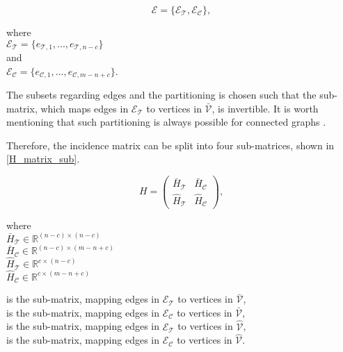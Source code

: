 \begin{equation}
  \label{edges1}
  \mathcal{E} = \{\mathcal{E_{\mathcal{T}}}, \mathcal{E_{\mathcal{C}}} \},
\end{equation}

\begin{minipage}[t]{0.35\textwidth}
where\\
\hspace*{8mm} $\mathcal{E_{\mathcal{T}}} = \{e_{\mathcal{T},1}, ..., e_{\mathcal{T},n-c}\}$\\
and\\
\hspace*{8mm} $\mathcal{E_{\mathcal{C}}} = \{e_{\mathcal{C},1}, ..., e_{\mathcal{C},m-n+c}\}$. 
\end{minipage}

The subsets regarding edges and the partitioning is chosen such that the sub-matrix, which maps edges in $\mathcal{E_{\mathcal{T}}}$ to vertices in $\bar{\mathcal{V}}$, is invertible. It is worth mentioning that such partitioning is always possible for connected graphs \cite{deo2017graph}. 

Therefore, the incidence matrix can be split into four sub-matrices, shown in \eqref{H_matrix_sub}.

\begin{equation}
\label{H_matrix_sub}
H=
\begin{pmatrix}
\bar{H}_{\mathcal{T}} & \bar{H}_{\mathcal{C}} \\[3pt]
\hat{H}_{\mathcal{T}} & \hat{H}_{\mathcal{C}}
\end{pmatrix},
\end{equation}

\begin{minipage}[t]{0.3\textwidth}
where\\
\hspace*{8mm} $\bar{H}_{\mathcal{T}} \in \mathbb{R}^{(n-c) \times (n-c)}$\\ 
\hspace*{8mm} $\bar{H}_{\mathcal{C}} \in \mathbb{R}^{(n-c) \times (m\!-\!n\!+\!c)}$\\
\hspace*{8mm} $\hat{H}_{\mathcal{T}} \in \mathbb{R}^{c \times (n-c)}$\\
\hspace*{8mm} $\hat{H}_{\mathcal{C}} \in \mathbb{R}^{c \times (m-n+c)}$
\end{minipage}
\begin{minipage}[t]{0.68\textwidth}
\vspace*{-0.1mm}
is the sub-matrix, mapping edges in $\mathcal{E_{\mathcal{T}}}$ to vertices in $\bar{\mathcal{V}}$,\\ 
is the sub-matrix, mapping edges in $\mathcal{E_{\mathcal{C}}}$ to vertices in $\bar{\mathcal{V}}$,\\
is the sub-matrix, mapping edges in $\mathcal{E_{\mathcal{T}}}$ to vertices in $\hat{\mathcal{V}}$,\\
is the sub-matrix, mapping edges in $\mathcal{E_{\mathcal{C}}}$ to vertices in $\hat{\mathcal{V}}$. 
\end{minipage}

